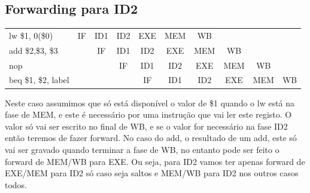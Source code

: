 \documentclass[pdftex,12pt,a4paper]{report}
\begin{document}
\subsection{Forwarding para ID2}

\begin{table}[!htb]
\centering
\label{my-label}
\begin{tabular}{lccc|c|c|c|ccc}
\cline{2-7}
\multicolumn{1}{l|}{lw \$1, 0(\$0)} & \multicolumn{1}{c|}{IF} & \multicolumn{1}{c|}{ID1} & ID2 & EXE & \cellcolor[HTML]{F8A102}MEM & \cellcolor[HTML]{FFCC67}WB  &                          &                          &                         \\ \cline{2-8}
add \$2,\$3, \$3                   & \multicolumn{1}{c|}{}   & \multicolumn{1}{c|}{IF}  & ID1 & ID2 & \cellcolor[HTML]{F8A102}EXE & \cellcolor[HTML]{FFCC67}MEM & \multicolumn{1}{c|}{WB}  &                          &                         \\ \cline{3-9}
nop                               &                         & \multicolumn{1}{c|}{}    & IF  & ID1 & ID2                         & EXE                         & \multicolumn{1}{c|}{MEM} & \multicolumn{1}{c|}{WB}  &                         \\ \cline{4-10} 
beq \$1, \$2, label                 &                         &                          &     & IF  & ID1                         & \cellcolor[HTML]{F8A102}ID2 & \multicolumn{1}{c|}{EXE} & \multicolumn{1}{c|}{MEM} & \multicolumn{1}{c|}{WB} \\ \cline{5-10} 
\end{tabular}
\end{table}

Neste caso assumimos que só está disponível o valor de \$1 quando o lw está na fase de MEM, e este é necessário por uma instrução que vai ler este registo. O valor só vai ser escrito no final de WB, e se o valor for necessário na fase ID2 então teremos de fazer forward. No caso do add, o resultado de um add, este só vai ser gravado quando terminar a fase de WB, no entanto pode ser feito o forward de MEM/WB para EXE. Ou seja, para ID2 vamos ter apenas forward de EXE/MEM para ID2  só caso seja saltos e MEM/WB para ID2 nos outros casos todos.

\newpage
\end{document}
